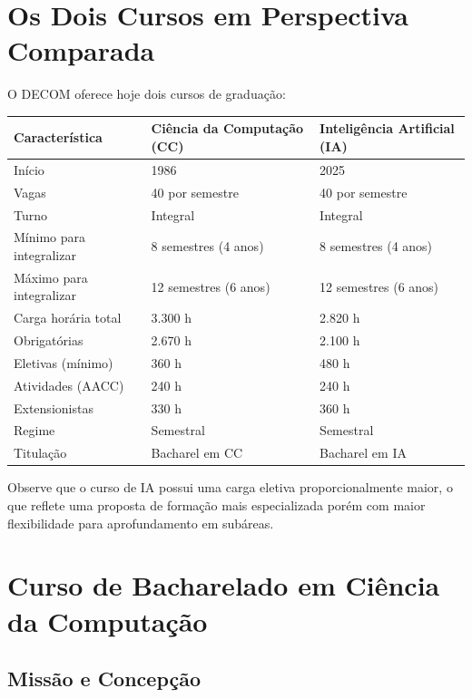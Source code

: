 \documentclass[9pt,a4paper]{extarticle}
\newcommand{\ntc}[1]{\textcolor{notice}{#1}}
\newcommand{\cc}[1]{\textcolor{cccolor}{\textbf{#1}}}
\newcommand{\ia}[1]{\textcolor{iacolor}{\textbf{#1}}}
\begin{document}
\section{Os Dois Cursos em Perspectiva Comparada}

O DECOM oferece hoje dois cursos de graduação:

\begin{center}
\renewcommand{\arraystretch}{1.4}
\begin{tabularx}{\textwidth}{lXX}
\toprule
\textbf{Característica} & \cc{Ciência da Computação (CC)} & \ia{Inteligência Artificial (IA)} \\
\midrule
Início & 1986 & 2025 \\
Vagas & 40 por semestre & 40 por semestre \\
Turno & Integral & Integral \\
Mínimo para integralizar & 8 semestres (4 anos) & 8 semestres (4 anos) \\
Máximo para integralizar & 12 semestres (6 anos) & 12 semestres (6 anos) \\
Carga horária total & 3.300 h & 2.820 h \\
Obrigatórias & 2.670 h & 2.100 h \\
Eletivas (mínimo) & 360 h & 480 h \\
Atividades (AACC) & 240 h & 240 h \\
Extensionistas & 330 h & 360 h \\
Regime & Semestral & Semestral \\
Titulação & Bacharel em CC & Bacharel em IA \\
\bottomrule
\end{tabularx}
\end{center}

\ntc{Observe que o curso de IA possui uma carga eletiva proporcionalmente maior, o que reflete uma proposta de formação mais especializada porém com maior flexibilidade para aprofundamento em subáreas.}

\section{Curso de Bacharelado em Ciência da Computação}

\subsection{Missão e Concepção}
\end{document}
